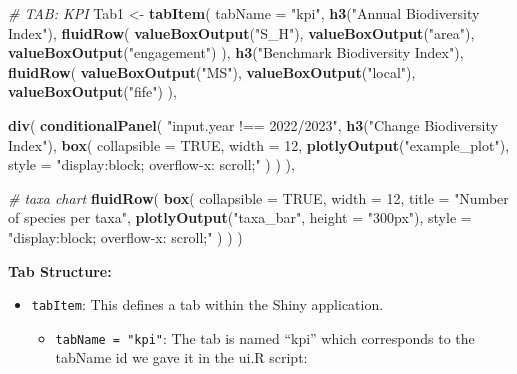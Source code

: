 \documentclass[
]{book}
\newenvironment{Shaded}{\begin{snugshade}}{\end{snugshade}}
\newcommand{\AttributeTok}[1]{\textcolor[rgb]{0.13,0.29,0.53}{#1}}
\newcommand{\CommentTok}[1]{\textcolor[rgb]{0.56,0.35,0.01}{\textit{#1}}}
\newcommand{\ConstantTok}[1]{\textcolor[rgb]{0.56,0.35,0.01}{#1}}
\newcommand{\DecValTok}[1]{\textcolor[rgb]{0.00,0.00,0.81}{#1}}
\newcommand{\FunctionTok}[1]{\textcolor[rgb]{0.13,0.29,0.53}{\textbf{#1}}}
\newcommand{\NormalTok}[1]{#1}
\newcommand{\OtherTok}[1]{\textcolor[rgb]{0.56,0.35,0.01}{#1}}
\newcommand{\StringTok}[1]{\textcolor[rgb]{0.31,0.60,0.02}{#1}}
\providecommand{\tightlist}{%
  \setlength{\itemsep}{0pt}\setlength{\parskip}{0pt}}
\begin{document}
\begin{Shaded}
\begin{Highlighting}[]
\CommentTok{\# TAB: KPI}
\NormalTok{Tab1 }\OtherTok{\textless{}{-}} \FunctionTok{tabItem}\NormalTok{(}
  \AttributeTok{tabName =} \StringTok{"kpi"}\NormalTok{,}
  \FunctionTok{h3}\NormalTok{(}\StringTok{"Annual Biodiversity Index"}\NormalTok{),}
  \FunctionTok{fluidRow}\NormalTok{(}
    \FunctionTok{valueBoxOutput}\NormalTok{(}\StringTok{"S\_H"}\NormalTok{),}
    \FunctionTok{valueBoxOutput}\NormalTok{(}\StringTok{"area"}\NormalTok{),}
    \FunctionTok{valueBoxOutput}\NormalTok{(}\StringTok{"engagement"}\NormalTok{)}
\NormalTok{  ),}
  \FunctionTok{h3}\NormalTok{(}\StringTok{"Benchmark Biodiversity Index"}\NormalTok{),}
  \FunctionTok{fluidRow}\NormalTok{(}
    \FunctionTok{valueBoxOutput}\NormalTok{(}\StringTok{"MS"}\NormalTok{),}
    \FunctionTok{valueBoxOutput}\NormalTok{(}\StringTok{"local"}\NormalTok{),}
    \FunctionTok{valueBoxOutput}\NormalTok{(}\StringTok{"fife"}\NormalTok{)}
\NormalTok{  ),}
  
  \FunctionTok{div}\NormalTok{(}
    \FunctionTok{conditionalPanel}\NormalTok{(}
      \StringTok{"input.year !== \textquotesingle{}2022/2023\textquotesingle{}"}\NormalTok{,}
      \FunctionTok{h3}\NormalTok{(}\StringTok{"Change Biodiversity Index"}\NormalTok{),}
      \FunctionTok{box}\NormalTok{(}
        \AttributeTok{collapsible =} \ConstantTok{TRUE}\NormalTok{, }\AttributeTok{width =} \DecValTok{12}\NormalTok{,}
        \FunctionTok{plotlyOutput}\NormalTok{(}\StringTok{"example\_plot"}\NormalTok{), }\AttributeTok{style =} \StringTok{"display:block; overflow{-}x: scroll;"}
\NormalTok{      )}
\NormalTok{    )}
\NormalTok{  ),}

  \CommentTok{\# taxa chart}
  \FunctionTok{fluidRow}\NormalTok{(}
    \FunctionTok{box}\NormalTok{(}
      \AttributeTok{collapsible =} \ConstantTok{TRUE}\NormalTok{, }\AttributeTok{width =} \DecValTok{12}\NormalTok{, }\AttributeTok{title =} \StringTok{"Number of species per taxa"}\NormalTok{,}
      \FunctionTok{plotlyOutput}\NormalTok{(}\StringTok{"taxa\_bar"}\NormalTok{, }\AttributeTok{height =} \StringTok{"300px"}\NormalTok{), }\AttributeTok{style =} \StringTok{"display:block; overflow{-}x: scroll;"}
\NormalTok{    )}
\NormalTok{  )}
\NormalTok{)}
\end{Highlighting}
\end{Shaded}

\textbf{Tab Structure:}

\begin{itemize}
\tightlist
\item
  \texttt{tabItem}: This defines a tab within the Shiny application.

  \begin{itemize}
  \tightlist
  \item
    \texttt{tabName\ =\ "kpi"}: The tab is named ``kpi'' which corresponds to the tabName id we gave it in the ui.R script:
  \end{itemize}
\end{itemize}
\end{document}
